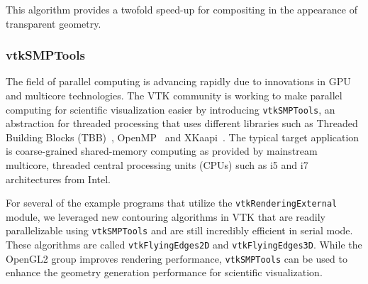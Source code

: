 This algorithm provides a twofold speed-up for compositing in the appearance of transparent geometry.

\subsubsection{vtkSMPTools}

The field of parallel computing is advancing rapidly due to innovations in GPU and multicore technologies.
The VTK community is working to make parallel computing for scientific visualization easier by introducing \texttt{vtkSMPTools}, an abstraction for threaded processing that uses different libraries such as Threaded Building Blocks (TBB)~\cite{TBB:2016}, OpenMP~\cite{OpenMP:2016} and XKaapi~\cite{Gautier:2013}.
The typical target application is coarse-grained shared-memory computing as provided by mainstream multicore, threaded central processing units (CPUs) such as i5 and i7 architectures from Intel.

For several of the example programs that utilize the \texttt{vtkRenderingExternal} module, we leveraged new contouring algorithms in VTK that are readily parallelizable using \texttt{vtkSMPTools} and are still incredibly efficient in serial mode. These algorithms are called \texttt{vtkFlyingEdges2D} and \texttt{vtkFlyingEdges3D}.
While the OpenGL2 group improves rendering performance, \texttt{vtkSMPTools} can be used to enhance the geometry generation performance for scientific visualization.
